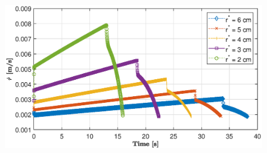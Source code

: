\documentclass[letterpaper,12pt]{article}
\begin{document}
\begin{figure} [!h]
	\centering
	\includegraphics[height = 8.4cm]{graphs/q2_rdot.eps}
\end{figure}

\end{document}
